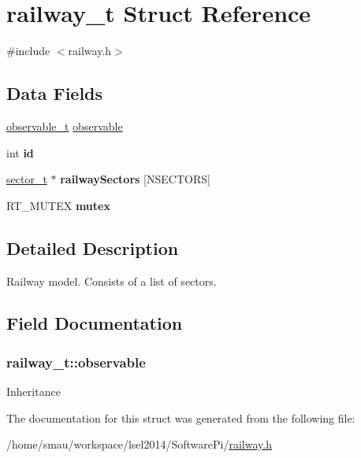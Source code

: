 \hypertarget{structrailway__t}{\section{railway\-\_\-t Struct Reference}
\label{structrailway__t}
}


{\ttfamily \#include $<$railway.\-h$>$}

\subsection*{Data Fields}
\begin{DoxyCompactItemize}
\item 
\hyperlink{structobservable__t}{observable\-\_\-t} \hyperlink{structrailway__t_a4fe8feaf0f90748f284bfe253bad9119}{observable}
\item 
\hypertarget{structrailway__t_ab257d01b6bb5c0d7d12c57d365fb1ace}{int {\bfseries id}}\label{structrailway__t_ab257d01b6bb5c0d7d12c57d365fb1ace}

\item 
\hypertarget{structrailway__t_a5efb6366d79446893918f6b3e0f9cc78}{\hyperlink{structsector__t}{sector\-\_\-t} $\ast$ {\bfseries railway\-Sectors} \mbox{[}N\-S\-E\-C\-T\-O\-R\-S\mbox{]}}\label{structrailway__t_a5efb6366d79446893918f6b3e0f9cc78}

\item 
\hypertarget{structrailway__t_a3edcff0680f4422fdf12f7381dac9a8f}{R\-T\-\_\-\-M\-U\-T\-E\-X {\bfseries mutex}}\label{structrailway__t_a3edcff0680f4422fdf12f7381dac9a8f}

\end{DoxyCompactItemize}


\subsection{Detailed Description}
Railway model. Consists of a list of sectors. 

\subsection{Field Documentation}
\hypertarget{structrailway__t_a4fe8feaf0f90748f284bfe253bad9119}{
\subsubsection[{observable}]{ railway\-\_\-t\-::observable}}\label{structrailway__t_a4fe8feaf0f90748f284bfe253bad9119}
Inheritance 

The documentation for this struct was generated from the following file\-:\begin{DoxyCompactItemize}
\item 
/home/smau/workspace/lsel2014/\-Software\-Pi/\hyperlink{railway_8h}{railway.\-h}\end{DoxyCompactItemize}
